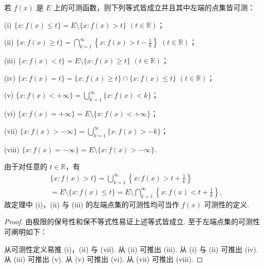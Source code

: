\documentclass[../../main.tex]{subfiles}%
\begin{document}
\begin{theorem}\label{theorem:定理3.2}
若 \(f(x)\) 是 \(E\) 上的可测函数，则下列等式皆成立并且其中左端的点集皆可测：

(i) \(\{x: f(x) \leqslant t\} = E \setminus \{x: f(x) > t\}\) \((t \in \mathbb{R})\)；

(ii) \(\{x: f(x) \geqslant t\} = \bigcap_{k = 1}^{\infty}\left\{x: f(x) > t - \frac{1}{k}\right\}\) \((t \in \mathbb{R})\)；

(iii) \(\{x: f(x) < t\} = E \setminus \{x: f(x) \geqslant t\}\) \((t \in \mathbb{R})\)；

(iv) \(\{x: f(x) = t\} = \{x: f(x) \geqslant t\} \cap \{x: f(x) \leqslant t\}\) \((t \in \mathbb{R})\)；

(v) \(\{x: f(x) < +\infty\} = \bigcup_{k = 1}^{\infty}\{x: f(x) < k\}\)；

(vi) \(\{x: f(x) = +\infty\} = E \setminus \{x: f(x) < +\infty\}\)；

(vii) \(\{x: f(x) > -\infty\} = \bigcup_{k = 1}^{\infty}\{x: f(x) > -k\}\)；

(viii) \(\{x: f(x) = -\infty\} = E \setminus \{x: f(x) > -\infty\}\).
\end{theorem}
\begin{remark}
由于对任意的 \(t \in \mathbb{R}\)，有
\begin{align*}
&\{x: f(x) > t\} = \bigcup_{k = 1}^{\infty}\left\{x: f(x) > t + \frac{1}{k}\right\}\\
&= E \setminus \{x: f(x) \leqslant t\} = E \setminus \bigcap_{k = 1}^{\infty}\left\{x: f(x) < t + \frac{1}{k}\right\},
\end{align*}
故定理中 (i)，(ii) 与 (iii) 的左端点集的可测性均可当作 \(f(x)\) 可测性的定义. 
\end{remark}
\begin{proof}
由极限的保号性和保不等式性易证上述等式皆成立. 至于左端点集的可测性可阐明如下：

从可测性定义易推 (i)，(ii) 与 (vii). 从 (ii) 可推出 (iii). 从 (i) 与 (ii) 可推出 (iv). 从 (iii) 可推出 (v). 从 (v) 可推出 (vi). 从 (vii) 可推出 (viii). 
\end{proof}
\end{document}
